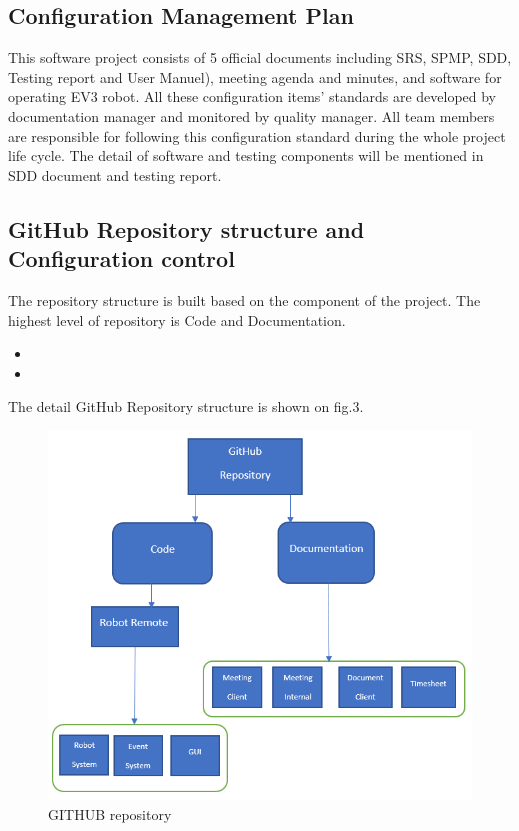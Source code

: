 \subsection{Configuration Management Plan}
This software project consists of 5 official documents including SRS, SPMP, SDD, Testing report and User Manuel), meeting agenda and minutes, and software for operating EV3 robot. All these configuration items’ standards are developed by documentation manager and monitored by quality manager. All team members are responsible for following this configuration standard during the whole project life cycle. The detail of software and testing components will be mentioned in SDD document and testing report.

\subsection{GitHub Repository structure and Configuration control}
The repository structure is built based on the component of the project. The highest level of repository is Code and Documentation. 
\begin{itemize}
	\item \texttt{}
	\item \texttt{}
\end{itemize}
The detail GitHub Repository structure is shown on fig.3.

\begin{figure}[H]
	\includegraphics[width=\linewidth]{GIT.png}  %
	\caption{GITHUB repository}
	\label{fig:GITHUB repository}				
\end{figure}

